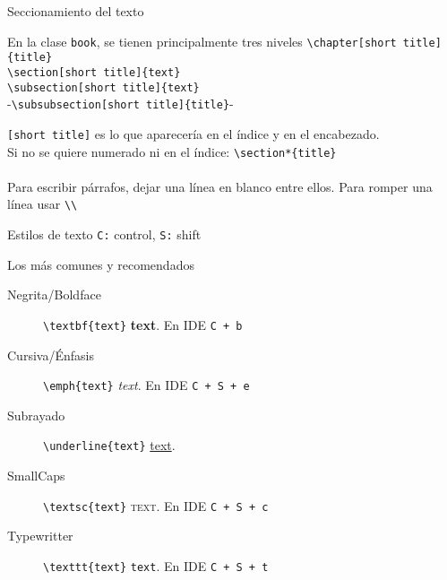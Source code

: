 \documentclass[12pt]{beamer}
\begin{document}
\begin{frame}[fragile]{Seccionamiento del texto}
	\begin{block}{En la clase \texttt{book}, se tienen principalmente tres niveles}
		\verb|\chapter[short title]{title}| \\
		\verb|\section[short title]{text}|\\
		\verb|\subsection[short title]{text}|\\
		-\verb|\subsubsection[short title]{title}|-
	\end{block}
	
	\texttt{[short title]} es lo que aparecería en el índice y en el encabezado. \\ 
	
	Si no se quiere numerado ni en el índice: \verb|\section*{title}|\\
	\hrulefill\\
	Para escribir párrafos, dejar una línea en blanco entre ellos. Para romper una línea usar \verb|\\|
\end{frame}

\begin{frame}[fragile]{Estilos de texto}
	\texttt{C:} control, \texttt{S:} shift
	\begin{block}{Los más comunes y recomendados}
		\begin{description}
			\item[Negrita/Boldface] \verb|\textbf{text}| \textbf{text}. En IDE \texttt{C + b}
			\item[Cursiva/Énfasis] \verb|\emph{text}| \emph{text}. En IDE \texttt{C + S + e}
			\item[Subrayado] \verb|\underline{text}| \underline{text}.
			\item[SmallCaps] \verb|\textsc{text}| \textsc{text}. En IDE \texttt{C + S + c}
			\item[Typewritter] \verb|\texttt{text}| \texttt{text}. En IDE \texttt{C + S + t}
		\end{description}
	\end{block}
\end{frame}
\end{document}
